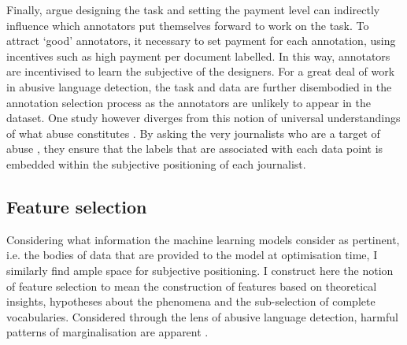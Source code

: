 Finally, \citet{Sabou:2014} argue  designing the task and setting the payment level can indirectly influence which annotators put themselves forward to work on the task.
To attract `good' annotators, it necessary to set payment for each annotation, using incentives such as high payment per document labelled.
In this way, annotators are incentivised to learn the subjective  of the designers.
For a great deal of work in abusive language detection, the task and data are further disembodied in the annotation selection process as the annotators are unlikely to appear in the dataset. 
One study however diverges from this notion of universal understandings of what abuse constitutes \citep{Arora:2020}.
By asking the very journalists who are a target of abuse , they ensure that the labels that are associated with each data point is embedded within the subjective positioning of each journalist.


\subsection{Feature selection}
Considering what information the machine learning models consider as pertinent, i.e. the bodies of data that are provided to the model at optimisation time, I similarly find ample space for subjective positioning.
I construct here the notion of feature selection to mean the construction of features based on theoretical insights, hypotheses about the phenomena and  the sub-selection of complete vocabularies.
Considered through the lens of abusive language detection, harmful patterns of marginalisation are apparent .

